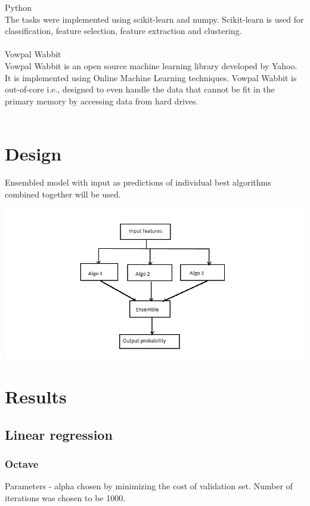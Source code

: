 \documentclass[10pt]{article}
\begin{document}
Python\\
The tasks were implemented using scikit-learn and numpy. Scikit-learn is used for classification, feature selection, feature extraction and clustering.\\\\

Vowpal Wabbit\\
Vowpal Wabbit is an open source machine learning library developed by Yahoo. It is implemented using Online Machine Learning techniques. Vowpal Wabbit is out-of-core i.e., designed to even handle the data that cannot be fit in the primary memory by accessing data from hard drives.\\\\

\section{Design}
Ensembled model with input as predictions of individual best algorithms combined together will be used. 
\begin{center}
\includegraphics[scale=0.5]{flowchart}
\end{center}

\section{Results}
\subsection{Linear regression}

\subsubsection{Octave}
Parameters - alpha chosen by minimizing the cost of validation set. Number of iterations was chosen to be 1000.
\\
\end{document}
